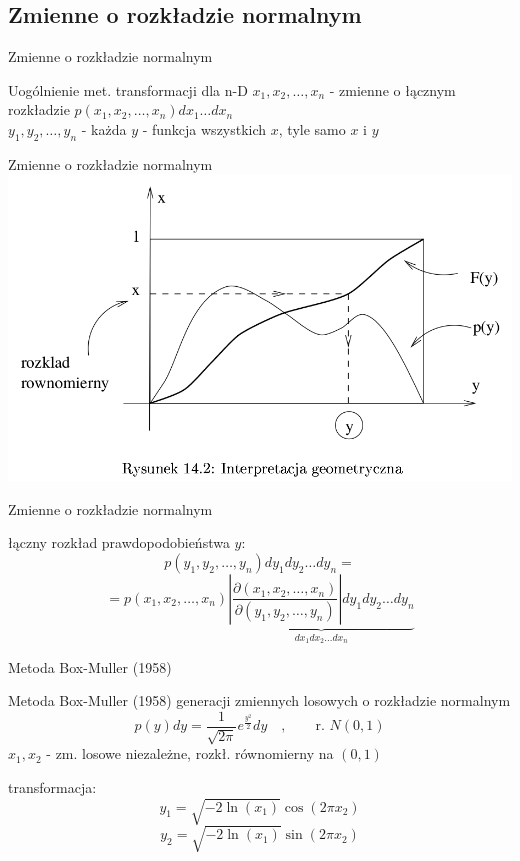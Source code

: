 \subsection{Zmienne o rozkładzie normalnym}
\begin{frame}{Zmienne o rozkładzie normalnym}
	\begin{block}{Uogólnienie met. transformacji dla n-D}
		$x_{1},x_{2},\ldots,x_{n}$ - zmienne o łącznym rozkładzie $p(x_{1},x_{2},\ldots,x_{n})dx_{1} \ldots dx_{n}$\\
		\vspace{0.5cm}
		$y_{1},y_{2},\ldots,y_{n}$ - każda $y$ - funkcja wszystkich $x$, tyle samo $x$ i $y$
	\end{block}
\end{frame}
\begin{frame}{Zmienne o rozkładzie normalnym}
	\centering \includegraphics[width=1\linewidth]{img/14/14_6_1_img.png}
\end{frame}
\begin{frame}{Zmienne o rozkładzie normalnym}
	\begin{block}{łączny rozkład prawdopodobieństwa $y$:}
		\[
			p(y_{1},y_{2},\ldots,y_{n})dy_{1}dy_{2} \ldots dy_{n} =
		\]
		\[
			= p(x_{1},x_{2},\ldots,x_{n}) \underbrace{\left|\frac{\partial(x_{1},x_{2},\ldots,x_{n})}{\partial(y_{1},y_{2},\ldots,y_{n})}\right| dy_{1}dy_{2} \ldots dy_{n}}_{dx_{1}dx_{2} \ldots dx_{n}}
		\]
	\end{block}
\end{frame}
\begin{frame}{Metoda Box-Muller (1958)}
	\begin{block}{Metoda Box-Muller (1958) generacji zmiennych losowych o rozkładzie normalnym}
		\[
			p(y)dy = \frac{1}{\sqrt{2\pi}}e^{\frac{y^{2}}{2}}dy \quad, \qquad \text{r. } N(0,1)
		\]
		$x_{1}, x_{2}$ - zm. losowe niezależne, rozkł. równomierny na $(0, 1)$
	\end{block}

	\begin{block}{transformacja:}
		\[
			y_{1} = \sqrt{-2 \ln(x_{1})} \cos(2\pi x_{2})
		\]
		\[
			y_{2} = \sqrt{-2 \ln(x_{1})} \sin(2\pi x_{2})
		\]
	\end{block}
\end{frame}
